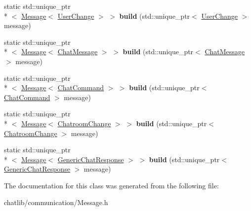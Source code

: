 \begin{DoxyCompactItemize}
\item 
\hypertarget{classSimpleChat_1_1MessageBuilder_ab250ed6ff304acf25e5acb87ffff4326}{static std\-::unique\-\_\-ptr\\*
$<$ \hyperlink{classSimpleChat_1_1Message}{Message}$<$ \hyperlink{classSimpleChat_1_1UserChange}{User\-Change} $>$ $>$ {\bfseries build} (std\-::unique\-\_\-ptr$<$ \hyperlink{classSimpleChat_1_1UserChange}{User\-Change} $>$ message)}\label{classSimpleChat_1_1MessageBuilder_ab250ed6ff304acf25e5acb87ffff4326}

\item 
\hypertarget{classSimpleChat_1_1MessageBuilder_a23f12666aa0f0980d87ab006276a5c77}{static std\-::unique\-\_\-ptr\\*
$<$ \hyperlink{classSimpleChat_1_1Message}{Message}$<$ \hyperlink{classSimpleChat_1_1ChatMessage}{Chat\-Message} $>$ $>$ {\bfseries build} (std\-::unique\-\_\-ptr$<$ \hyperlink{classSimpleChat_1_1ChatMessage}{Chat\-Message} $>$ message)}\label{classSimpleChat_1_1MessageBuilder_a23f12666aa0f0980d87ab006276a5c77}

\item 
\hypertarget{classSimpleChat_1_1MessageBuilder_accd282d1df8608cc050682ef1d0312f4}{static std\-::unique\-\_\-ptr\\*
$<$ \hyperlink{classSimpleChat_1_1Message}{Message}$<$ \hyperlink{classSimpleChat_1_1ChatCommand}{Chat\-Command} $>$ $>$ {\bfseries build} (std\-::unique\-\_\-ptr$<$ \hyperlink{classSimpleChat_1_1ChatCommand}{Chat\-Command} $>$ message)}\label{classSimpleChat_1_1MessageBuilder_accd282d1df8608cc050682ef1d0312f4}

\item 
\hypertarget{classSimpleChat_1_1MessageBuilder_a6cb11691013c56108d9318e3ca263888}{static std\-::unique\-\_\-ptr\\*
$<$ \hyperlink{classSimpleChat_1_1Message}{Message}$<$ \hyperlink{classSimpleChat_1_1ChatroomChange}{Chatroom\-Change} $>$ $>$ {\bfseries build} (std\-::unique\-\_\-ptr$<$ \hyperlink{classSimpleChat_1_1ChatroomChange}{Chatroom\-Change} $>$ message)}\label{classSimpleChat_1_1MessageBuilder_a6cb11691013c56108d9318e3ca263888}

\item 
\hypertarget{classSimpleChat_1_1MessageBuilder_a2b4e01cb134cf27cd42646bf5b98aa09}{static std\-::unique\-\_\-ptr\\*
$<$ \hyperlink{classSimpleChat_1_1Message}{Message}$<$ \hyperlink{classSimpleChat_1_1GenericChatResponse}{Generic\-Chat\-Response} $>$ $>$ {\bfseries build} (std\-::unique\-\_\-ptr$<$ \hyperlink{classSimpleChat_1_1GenericChatResponse}{Generic\-Chat\-Response} $>$ message)}\label{classSimpleChat_1_1MessageBuilder_a2b4e01cb134cf27cd42646bf5b98aa09}

\end{DoxyCompactItemize}


The documentation for this class was generated from the following file\-:\begin{DoxyCompactItemize}
\item 
chatlib/communication/Message.\-h\end{DoxyCompactItemize}
